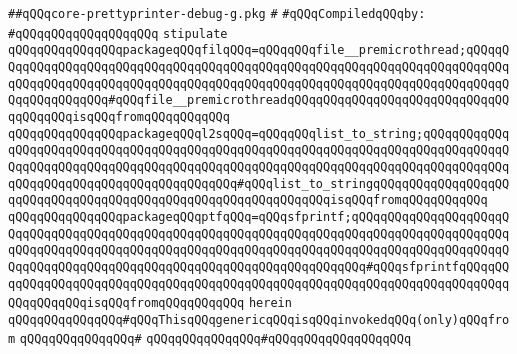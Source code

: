 \label{src/lib/prettyprint/big/src/core-prettyprinter-debug-g.pkg}
\verb|##qQQqcore-prettyprinter-debug-g.pkg|\newline
\verb|#|\newline
\newline
\verb|#qQQqCompiledqQQqby:|\newline
\verb|#qQQqqQQqqQQqqQQqqQQq|\newline
\newline
\verb|stipulate|\newline
\verb|qQQqqQQqqQQqqQQqpackageqQQqfilqQQq=qQQqqQQqfile__premicrothread;qQQqqQQqqQQqqQQqqQQqqQQqqQQqqQQqqQQqqQQqqQQqqQQqqQQqqQQqqQQqqQQqqQQqqQQqqQQqqQQqqQQqqQQqqQQqqQQqqQQqqQQqqQQqqQQqqQQqqQQqqQQqqQQqqQQqqQQqqQQqqQQqqQQqqQQqqQQqqQQq#qQQqfile__premicrothreadqQQqqQQqqQQqqQQqqQQqqQQqqQQqqQQqqQQqqQQqisqQQqfromqQQqqQQqqQQq|\newline
\verb|qQQqqQQqqQQqqQQqpackageqQQql2sqQQq=qQQqqQQqlist_to_string;qQQqqQQqqQQqqQQqqQQqqQQqqQQqqQQqqQQqqQQqqQQqqQQqqQQqqQQqqQQqqQQqqQQqqQQqqQQqqQQqqQQqqQQqqQQqqQQqqQQqqQQqqQQqqQQqqQQqqQQqqQQqqQQqqQQqqQQqqQQqqQQqqQQqqQQqqQQqqQQqqQQqqQQqqQQqqQQqqQQqqQQq#qQQqlist_to_stringqQQqqQQqqQQqqQQqqQQqqQQqqQQqqQQqqQQqqQQqqQQqqQQqqQQqqQQqqQQqqQQqisqQQqfromqQQqqQQqqQQq|\newline
\verb|qQQqqQQqqQQqqQQqpackageqQQqptfqQQq=qQQqsfprintf;qQQqqQQqqQQqqQQqqQQqqQQqqQQqqQQqqQQqqQQqqQQqqQQqqQQqqQQqqQQqqQQqqQQqqQQqqQQqqQQqqQQqqQQqqQQqqQQqqQQqqQQqqQQqqQQqqQQqqQQqqQQqqQQqqQQqqQQqqQQqqQQqqQQqqQQqqQQqqQQqqQQqqQQqqQQqqQQqqQQqqQQqqQQqqQQqqQQqqQQqqQQqqQQqqQQq#qQQqsfprintfqQQqqQQqqQQqqQQqqQQqqQQqqQQqqQQqqQQqqQQqqQQqqQQqqQQqqQQqqQQqqQQqqQQqqQQqqQQqqQQqqQQqqQQqisqQQqfromqQQqqQQqqQQq|\newline
\verb|herein|\newline
\newline
\verb|qQQqqQQqqQQqqQQq#qQQqThisqQQqgenericqQQqisqQQqinvokedqQQq(only)qQQqfrom|\newline
\verb|qQQqqQQqqQQqqQQq#|\newline
\verb|qQQqqQQqqQQqqQQq#qQQqqQQqqQQqqQQqqQQq|\newline
